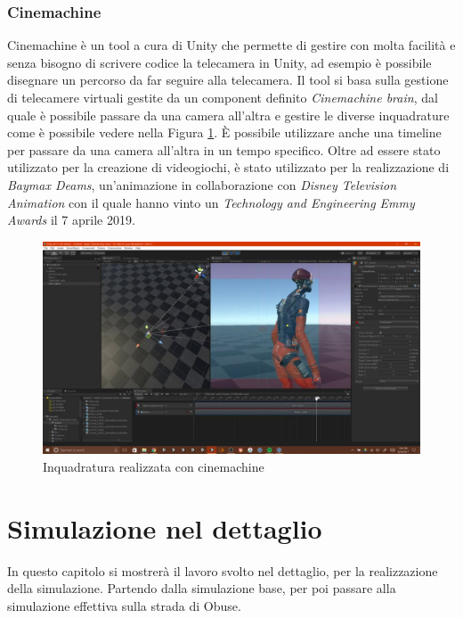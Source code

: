 \documentclass[12pt, openany]{book}
\begin{document}
	\subsection{Cinemachine}
	Cinemachine \cite{Cinemachine} è un tool a cura di Unity che permette di gestire con molta facilità e senza bisogno di scrivere codice la telecamera in Unity, ad esempio è possibile disegnare un percorso da far seguire alla telecamera. Il tool si basa sulla gestione di telecamere virtuali gestite da un component definito \emph{Cinemachine brain}, dal quale è possibile passare da una camera all'altra e gestire le diverse inquadrature come è possibile vedere nella Figura \ref{fig:CinemachineLogo}. È possibile utilizzare anche una timeline per passare da una camera all'altra in un tempo specifico. Oltre ad essere stato utilizzato per la creazione di videogiochi, è stato utilizzato per la realizzazione di \emph{Baymax Deams}, un'animazione in collaborazione con \emph{Disney Television Animation} con il quale hanno vinto un \emph{ Technology and Engineering Emmy Awards} il 7 aprile 2019.
		\begin{figure}[H]
		\centering
		\includegraphics[width=1\linewidth]{"Immagini/CinemachineLogo.jpg"}
		\caption{Inquadratura realizzata con cinemachine}
		\label{fig:CinemachineLogo}
	\end{figure}
	
	
	\chapter{Simulazione nel dettaglio}
	In questo capitolo si mostrerà il lavoro svolto nel dettaglio, per la realizzazione della simulazione. Partendo dalla simulazione base, per poi passare alla simulazione effettiva sulla strada di Obuse. 
\end{document}
